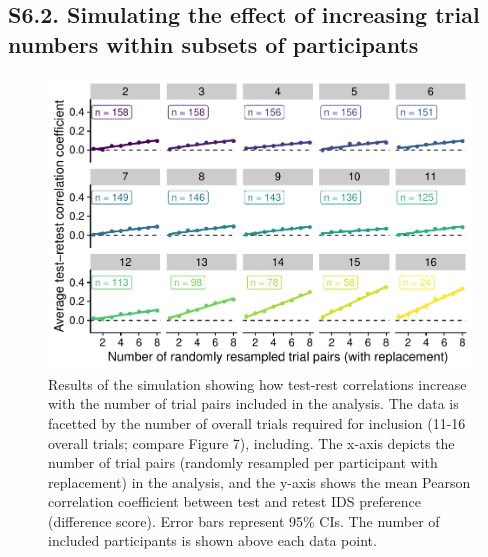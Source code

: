 \documentclass[
  man, donotrepeattitle,floatsintext]{apa6}
\begin{document}
\hypertarget{s6.2.-simulating-the-effect-of-increasing-trial-numbers-within-subsets-of-participants}{%
\subsection{S6.2. Simulating the effect of increasing trial numbers within subsets of participants}\label{s6.2.-simulating-the-effect-of-increasing-trial-numbers-within-subsets-of-participants}}

\begin{figure}
\centering
\includegraphics{MB1T_supplement_files/figure-latex/fig8-1.pdf}
\caption{\label{fig:fig8}Results of the simulation showing how test-rest correlations increase with the number of trial pairs included in the analysis. The data is facetted by the number of overall trials required for inclusion (11-16 overall trials; compare Figure 7), including. The x-axis depicts the number of trial pairs (randomly resampled per participant with replacement) in the analysis, and the y-axis shows the mean Pearson correlation coefficient between test and retest IDS preference (difference score). Error bars represent 95\% CIs. The number of included participants is shown above each data point.}
\end{figure}
\end{document}
